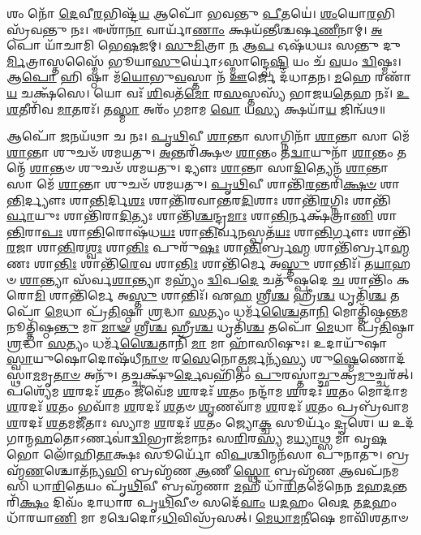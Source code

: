 𑌶𑌂 𑌨𑍋᳴ \ul{𑌦𑍇}\-𑌵𑍀\-\ul{𑌰}\-𑌭𑌿𑌷𑍍𑌟᳴\-\ul{𑌯} 𑌆𑌪𑍋᳴ 𑌭𑌵𑌨𑍍𑌤𑍁 \ul{𑌪𑍀}\-𑌤𑌯𑍇॑। \ul{𑌶𑌂}\-𑌯𑍋\-\ul{𑌰}\-𑌭𑌿𑌸𑍍𑌰᳴𑌵𑌨𑍍𑌤𑍁 𑌨𑌃। 𑌈𑌶𑌾᳴\-\ul{𑌨𑌾} 𑌵𑌾𑌰𑍍𑌯𑌾᳴\-\ul{𑌣𑌾𑌂} 𑌕𑍍𑌷𑌯᳴𑌨𑍍𑌤𑍀𑌶𑍍𑌚𑌰𑍍\mbox{}𑌷\-\ul{𑌣𑍀}\-𑌨𑌾𑌮𑍍। \ul{𑌅}\-𑌪𑍋 𑌯𑌾᳴𑌚𑌾𑌮𑌿 𑌭𑍇\-\ul{𑌷}\-𑌜𑌮𑍍। \ul{𑌸𑍁}\-\-\ul{𑌮𑌿}\-𑌤𑍍𑌰𑌾 \ul{𑌨} 𑌆\-\ul{𑌪} 𑌓𑌷᳴𑌧𑌯𑌃 𑌸𑌨𑍍𑌤𑍁 𑌦𑍁\-\ul{𑌰𑍍𑌮𑌿}\-𑌤𑍍𑌰𑌾𑌸𑍍𑌤𑌸𑍍𑌮𑍈᳴ 𑌭𑍂𑌯𑌾\-\ul{𑌸𑍁}\-𑌰𑍍𑌯𑍋॑𑌽𑌸𑍍𑌮𑌾𑌨𑍍𑌦𑍍𑌵𑍇\-\ul{𑌷𑍍𑌟𑌿} 𑌯𑌂 𑌚᳴ \ul{𑌵}\-𑌯𑌂 \ul{𑌦𑍍𑌵𑌿}\-𑌷𑍍𑌮𑌃। 𑌆\-\ul{𑌪𑍋} 𑌹𑌿 𑌷𑍍𑌠𑌾 𑌮᳴\-\ul{𑌯𑍋}\-𑌭𑍁\-\ul{𑌵}\-𑌸𑍍𑌤𑌾 𑌨᳴ \ul{𑌊}\-𑌰𑍍𑌜𑍇 𑌦᳴𑌧𑌾𑌤𑌨। \ul{𑌮}\-𑌹𑍇 𑌰𑌣𑌾᳴\-\ul{𑌯} 𑌚𑌕𑍍𑌷᳴𑌸𑍇। 𑌯𑍋 𑌵𑌃᳴ \ul{𑌶𑌿}\-𑌵𑌤᳴\-\ul{𑌮𑍋} 𑌰\-\ul{𑌸}\-𑌸𑍍𑌤𑌸𑍍𑌯᳴ 𑌭𑌾𑌜𑌯\-\ul{𑌤𑍇}\-𑌹 𑌨𑌃᳴। \ul{𑌉}\-\-\ul{𑌶}\-𑌤𑍀𑌰𑌿᳴𑌵 \ul{𑌮𑌾}\-𑌤𑌰𑌃᳴। 𑌤\-\ul{𑌸𑍍𑌮𑌾} 𑌅𑌰𑌂᳴ 𑌗𑌮𑌾𑌮 \ul{𑌵𑍋} 𑌯\-\ul{𑌸𑍍𑌯} 𑌕𑍍𑌷𑌯𑌾᳴\-\ul{𑌯} 𑌜𑌿𑌨𑍍𑌵᳴𑌥॥

𑌆𑌪𑍋᳴ \ul{𑌜}\-𑌨𑌯᳴𑌥𑌾 𑌚 𑌨𑌃। \ul{𑌪𑍃}\-\-\ul{𑌥𑌿}\-𑌵𑍀 \ul{𑌶𑌾}\-𑌨𑍍𑌤𑌾 𑌸𑌾𑌗𑍍𑌨𑌿𑌨𑌾᳴ \ul{𑌶𑌾}\-𑌨𑍍𑌤𑌾 𑌸𑌾 𑌮𑍇᳴ \ul{𑌶𑌾}\-𑌨𑍍𑌤𑌾 𑌶𑍁𑌚𑍞᳴ 𑌶𑌮𑌯𑌤𑍁। \ul{𑌅}\-𑌨𑍍𑌤𑌰𑌿᳴𑌕𑍍𑌷𑍞 \ul{𑌶𑌾}\-𑌨𑍍𑌤𑌂 𑌤\-\ul{𑌦𑍍𑌵𑌾}\-𑌯𑍁𑌨𑌾᳴ \ul{𑌶𑌾}\-𑌨𑍍𑌤𑌂 𑌤𑌨𑍍𑌮𑍇᳴ \ul{𑌶𑌾}\-𑌨𑍍𑌤𑍞 𑌶𑍁𑌚𑍞᳴ 𑌶𑌮𑌯𑌤𑍁। 𑌦𑍍𑌯𑍗𑌃  \ul{𑌶𑌾}\-𑌨𑍍𑌤𑌾 𑌸𑌾\-\ul{𑌦𑌿}\-𑌤𑍍𑌯𑍇𑌨᳴ \ul{𑌶𑌾}\-𑌨𑍍𑌤𑌾 𑌸𑌾 𑌮𑍇᳴ \ul{𑌶𑌾}\-𑌨𑍍𑌤𑌾 𑌶𑍁𑌚𑍞᳴ 𑌶𑌮𑌯𑌤𑍁। \ul{𑌪𑍃}\-\-\ul{𑌥𑌿}\-𑌵𑍀 𑌶𑌾𑌨𑍍𑌤𑌿᳴\-\ul{𑌰}\-𑌨𑍍𑌤𑌰𑌿᳴\-\ul{𑌕𑍍𑌷}\-\-\ul{𑍞} 𑌶𑌾\-\ul{𑌨𑍍𑌤𑌿}\-𑌰𑍍𑌦𑍍𑌯𑍗𑌃  𑌶𑌾\-\ul{𑌨𑍍𑌤𑌿}\-𑌰𑍍𑌦𑌿\-\ul{𑌶𑌃} 𑌶𑌾𑌨𑍍𑌤𑌿᳴𑌰𑌵𑌾𑌨𑍍𑌤𑌰\-\ul{𑌦𑌿}\-𑌶𑌾𑌃  𑌶𑌾𑌨𑍍𑌤𑌿᳴\-\ul{𑌰}\-𑌗𑍍𑌨𑌿𑌃  𑌶𑌾𑌨𑍍𑌤𑌿᳴\-\ul{𑌰𑍍𑌵𑌾}\-𑌯𑍁𑌃  𑌶𑌾𑌨𑍍𑌤𑌿᳴𑌰𑌾\-\ul{𑌦𑌿}\-𑌤𑍍𑌯𑌃  𑌶𑌾𑌨𑍍𑌤𑌿᳴\-\ul{𑌶𑍍𑌚}\-𑌨𑍍𑌦𑍍𑌰\-\ul{𑌮𑌾𑌃} 𑌶𑌾\-\ul{𑌨𑍍𑌤𑌿}\-𑌰𑍍𑌨𑌕𑍍𑌷᳴𑌤𑍍𑌰𑌾\-\ul{𑌣𑌿} 𑌶𑌾\-\ul{𑌨𑍍𑌤𑌿}\-𑌰𑌾\-\ul{𑌪𑌃} 𑌶𑌾\-\ul{𑌨𑍍𑌤𑌿}\-𑌰𑍋𑌷᳴𑌧\-\ul{𑌯𑌃} 𑌶𑌾\-\ul{𑌨𑍍𑌤𑌿}\-𑌰𑍍𑌵\-\ul{𑌨}\-𑌸𑍍𑌪𑌤᳴\-\ul{𑌯𑌃} 𑌶𑌾\-\ul{𑌨𑍍𑌤𑌿}\-𑌰𑍍𑌗𑍗𑌃  𑌶𑌾𑌨𑍍𑌤𑌿᳴\-\ul{𑌰}\-𑌜𑌾 𑌶𑌾\-\ul{𑌨𑍍𑌤𑌿}\-𑌰\-\ul{𑌶𑍍𑌵𑌃} 𑌶𑌾\-\ul{𑌨𑍍𑌤𑌿𑌃} 𑌪𑍁𑌰𑍁᳴\-\ul{𑌷𑌃} 𑌶𑌾\-\ul{𑌨𑍍𑌤𑌿}\-𑌰𑍍𑌬𑍍𑌰\-\ul{𑌹𑍍𑌮} 𑌶𑌾𑌨𑍍𑌤𑌿᳴𑌰𑍍𑌬𑍍𑌰𑌾\-\ul{𑌹𑍍𑌮}\-𑌣𑌃  𑌶𑌾\-\ul{𑌨𑍍𑌤𑌿𑌃} 𑌶𑌾𑌨𑍍𑌤𑌿᳴\-\ul{𑌰𑍇}\-𑌵 𑌶𑌾\-\ul{𑌨𑍍𑌤𑌿𑌃} 𑌶𑌾𑌨𑍍𑌤𑌿᳴𑌰𑍍𑌮𑍇 𑌅\-\ul{𑌸𑍍𑌤𑍁} 𑌶𑌾𑌨𑍍𑌤𑌿𑌃᳴। 𑌤\-\ul{𑌯𑌾}\-𑌹𑍞 \ul{𑌶𑌾}\-𑌨𑍍𑌤𑍍𑌯𑌾 𑌸᳴𑌰𑍍𑌵\-\ul{𑌶𑌾}\-𑌨𑍍𑌤𑍍𑌯𑌾 𑌮𑌹𑍍𑌯𑌂᳴ \ul{𑌦𑍍𑌵𑌿}\-𑌪\-\ul{𑌦𑍇} 𑌚𑌤𑍁᳴𑌷𑍍𑌪𑌦𑍇 \ul{𑌚} 𑌶𑌾𑌨𑍍𑌤𑌿𑌂᳴ 𑌕𑌰𑍋\-\ul{𑌮𑌿} 𑌶𑌾𑌨𑍍𑌤𑌿᳴𑌰𑍍𑌮𑍇 𑌅\-\ul{𑌸𑍍𑌤𑍁} 𑌶𑌾𑌨𑍍𑌤𑌿𑌃᳴। 𑌏\-\ul{𑌹} 𑌶𑍍𑌰𑍀\-\ul{𑌶𑍍𑌚} 𑌹𑍍𑌰𑍀\-\ul{𑌶𑍍𑌚} 𑌧𑍃𑌤𑌿᳴\-\ul{𑌶𑍍𑌚} 𑌤𑌪𑍋᳴ \ul{𑌮𑍇}\-𑌧𑌾 𑌪𑍍𑌰᳴\-\ul{𑌤𑌿}\-𑌷𑍍𑌠𑌾 \ul{𑌶𑍍𑌰}\-𑌦𑍍𑌧𑌾 \ul{𑌸}\-𑌤𑍍𑌯𑌂 𑌧𑌰𑍍𑌮᳴\-\ul{𑌶𑍍𑌚𑍈}\-𑌤𑌾\-\ul{𑌨𑌿} 𑌮𑍋𑌤𑍍𑌤𑌿᳴𑌷𑍍𑌠\-\ul{𑌨𑍍𑌤}\-𑌮𑌨𑍂𑌤𑍍𑌤𑌿᳴𑌷𑍍𑌠\-\ul{𑌨𑍍𑌤𑍁} 𑌮𑌾 \ul{𑌮𑌾}\-\-\ul{𑍟} 𑌶𑍍𑌰𑍀\-\ul{𑌶𑍍𑌚} 𑌹𑍍𑌰𑍀\-\ul{𑌶𑍍𑌚} 𑌧𑍃𑌤𑌿᳴\-\ul{𑌶𑍍𑌚} 𑌤𑌪𑍋᳴ \ul{𑌮𑍇}\-𑌧𑌾 𑌪𑍍𑌰᳴\-\ul{𑌤𑌿}\-𑌷𑍍𑌠𑌾 \ul{𑌶𑍍𑌰}\-𑌦𑍍𑌧𑌾 \ul{𑌸}\-𑌤𑍍𑌯𑌂 𑌧𑌰𑍍𑌮᳴\-\ul{𑌶𑍍𑌚𑍈}\-𑌤𑌾𑌨𑌿᳴ \ul{𑌮𑌾} 𑌮𑌾 𑌹𑌾᳴𑌸𑌿𑌷𑍁𑌃। 𑌉𑌦𑌾𑌯𑍁᳴𑌷𑌾 \ul{𑌸𑍍𑌵𑌾}\-𑌯𑍁𑌷𑍋𑌦𑍋𑌷᳴𑌧𑍀\-\ul{𑌨𑌾}\-\-\ul{𑍞} 𑌰\-\ul{𑌸𑍇}\-𑌨𑍋\-\ul{𑌤𑍍𑌪}\-𑌰𑍍𑌜𑌨𑍍𑌯᳴\-\ul{𑌸𑍍𑌯} 𑌶𑍁\-\ul{𑌷𑍍𑌮𑍇}\-𑌣𑍋𑌦᳴𑌸𑍍𑌥𑌾\-\ul{𑌮}\-𑌮𑍃\-\ul{𑌤𑌾}\-\-\ul{𑍞} 𑌅𑌨𑍁᳴। 𑌤𑌚𑍍𑌚𑌕𑍍𑌷𑍁᳴\-\ul{𑌰𑍍𑌦𑍇}\-𑌵𑌹𑌿᳴𑌤𑌂 \ul{𑌪𑍁}\-𑌰𑌸𑍍𑌤𑌾॑\-\ul{𑌚𑍍𑌛𑍁}\-𑌕𑍍𑌰\-\ul{𑌮𑍁}\-𑌚𑍍𑌚𑌰᳴𑌤𑍍। 𑌪𑌶𑍍𑌯𑍇᳴𑌮 \ul{𑌶}\-𑌰𑌦𑌃᳴ \ul{𑌶}\-𑌤𑌂 𑌜𑍀𑌵𑍇᳴𑌮 \ul{𑌶}\-𑌰𑌦𑌃᳴ \ul{𑌶}\-𑌤𑌂 𑌨𑌨𑍍𑌦𑌾᳴𑌮 \ul{𑌶}\-𑌰𑌦𑌃᳴ \ul{𑌶}\-𑌤𑌂 𑌮𑍋𑌦𑌾᳴𑌮 \ul{𑌶}\-𑌰𑌦𑌃᳴ \ul{𑌶}\-𑌤𑌂 𑌭𑌵𑌾᳴𑌮 \ul{𑌶}\-𑌰𑌦𑌃᳴ \ul{𑌶}\-𑌤𑍞 \ul{𑌶𑍃}\-𑌣𑌵𑌾᳴𑌮 \ul{𑌶}\-𑌰𑌦𑌃᳴ \ul{𑌶}\-𑌤𑌂 𑌪𑍍𑌰𑌬𑍍𑌰᳴𑌵𑌾𑌮 \ul{𑌶}\-𑌰𑌦𑌃᳴ \ul{𑌶}\-𑌤𑌮𑌜𑍀᳴𑌤𑌾𑌃 𑌸𑍍𑌯𑌾𑌮 \ul{𑌶}\-𑌰𑌦𑌃᳴ \ul{𑌶}\-𑌤𑌂 𑌜𑍍𑌯𑍋\-\ul{𑌕𑍍𑌚} 𑌸𑍂𑌰𑍍𑌯𑌂᳴ \ul{𑌦𑍃}\-𑌶𑍇। 𑌯 𑌉𑌦᳴𑌗𑌾𑌨𑍍𑌮\-\ul{𑌹}\-𑌤𑍋𑌽𑌰𑍍𑌣𑌵𑌾॑\-\ul{𑌦𑍍𑌵𑌿}\-𑌭𑍍𑌰𑌾𑌜᳴𑌮𑌾𑌨𑌃 𑌸\-\ul{𑌰𑌿}\-𑌰\-\ul{𑌸𑍍𑌯} 𑌮\-\ul{𑌧𑍍𑌯𑌾}\-𑌥𑍍𑌸 𑌮𑌾॑ 𑌵𑍃\-\ul{𑌷}\-𑌭𑍋 𑌲𑍋᳴𑌹𑌿\-\ul{𑌤𑌾}\-𑌕𑍍𑌷𑌃 𑌸𑍂𑌰𑍍𑌯𑍋᳴ 𑌵𑌿\-\ul{𑌪}\-𑌶𑍍𑌚𑌿𑌨𑍍𑌮𑌨᳴𑌸𑌾 𑌪𑍁𑌨𑌾𑌤𑍁। 𑌬𑍍𑌰𑌹𑍍𑌮᳴\-\ul{𑌣}\-𑌶𑍍𑌚𑍋𑌤᳴𑌨𑍍𑌯\-\ul{𑌸𑌿} 𑌬𑍍𑌰𑌹𑍍𑌮᳴𑌣 \ul{𑌆}\-𑌣𑍀 \ul{𑌸𑍍𑌥𑍋} 𑌬𑍍𑌰𑌹𑍍𑌮᳴𑌣 \ul{𑌆}\-𑌵𑌪᳴𑌨𑌮𑌸𑌿 𑌧𑌾\-\ul{𑌰𑌿}\-𑌤𑍇𑌯𑌂 𑌪𑍃᳴\-\ul{𑌥𑌿}\-𑌵𑍀 𑌬𑍍𑌰𑌹𑍍𑌮᳴𑌣𑌾 \ul{𑌮}\-𑌹𑍀 𑌧𑌾᳴\-\ul{𑌰𑌿}\-𑌤𑌮𑍇᳴𑌨𑍇𑌨 \ul{𑌮}\-𑌹\-\ul{𑌦}\-𑌨𑍍𑌤𑌰𑌿᳴\-\ul{𑌕𑍍𑌷𑌂} 𑌦𑌿𑌵𑌂᳴ 𑌦𑌾𑌧𑌾𑌰 𑌪𑍃\-\ul{𑌥𑌿}\-𑌵𑍀𑍞 𑌸𑌦𑍇᳴\-\ul{𑌵𑌾𑌂} 𑌯\-\ul{𑌦}\-𑌹𑌂 𑌵𑍇\-\ul{𑌦} 𑌤\-\ul{𑌦}\-𑌹𑌂 𑌧𑌾᳴𑌰𑌯𑌾\-\ul{𑌣𑌿} 𑌮𑌾 𑌮𑌦𑍍𑌵𑍇𑌦𑍋𑌽\-\ul{𑌧𑌿}\-𑌵𑌿𑌸𑍍𑌰᳴𑌸𑌤𑍍। \ul{𑌮𑍇}\-\-\ul{𑌧𑌾}\-\-\ul{𑌮}\-\-\ul{𑌨𑍀}\-𑌷𑍇 𑌮𑌾𑌵𑌿᳴𑌶𑌤𑌾𑍞 